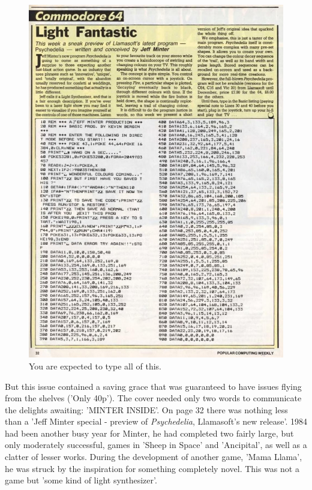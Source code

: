 \clearpage
\begin{figure}[H]
    \centering
    \begin{adjustbox}{width=12cm,center}
      \includegraphics[width=12cm]{src/listing/PopularComputing_Weekly_Issue_1984-12-13_0031.jpg}%
    \end{adjustbox}
\caption{You are expected to type all of this.}
\end{figure}
But this issue contained a saving grace that was guaranteed to have issues flying from the shelves ('Only 40p'). The cover needed only two
 words to communicate the delights awaiting: 'MINTER INSIDE'. On page 32 there was nothing less than a 'Jeff Minter special - preview of
\textit{Psychedelia}, Llamasoft's new release'. 1984 had been another busy year for Minter, he had completed two fairly large, but only
moderately successful, games in 'Sheep in Space' and 'Ancipital', as well as a clatter of lesser works. During the development of another
game, 'Mama Llama', he was struck by the inspiration for something completely novel. This was not a game but 'some kind of light synthesizer'.


